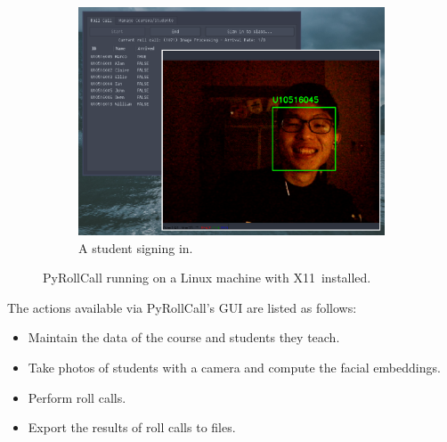 \begin{figure}[!htb]
\begin{subfigure}[b]{0.32\linewidth}
    \includegraphics[width=\linewidth]{figures/preview3.eps}
    \caption{A student signing in.}
  \end{subfigure}
  \caption{PyRollCall running on a Linux machine with X11\protect\footnotemark \ installed.}
  \label{fig:systemAppearance}
\end{figure}



The actions available via PyRollCall's GUI are listed as follows:
\vspace{0.5cm}

\begin{itemize}
  \item Maintain the data of the course and students they teach.
  \item Take photos of students with a camera and compute the facial embeddings.
  \item Perform roll calls.
  \item Export the results of roll calls to files.
\end{itemize}
\setstretch{\myContentLineSpacing}


